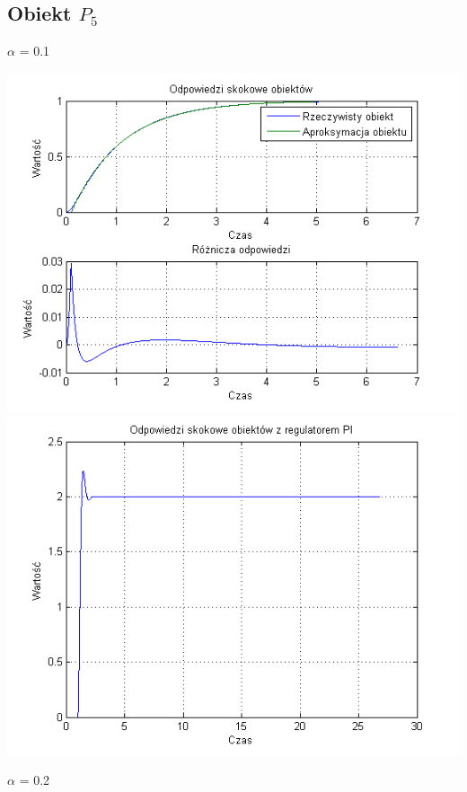 \documentclass[10pt,a4paper]{article}
\begin{document}
\subsection{Obiekt $P_5$}
$\alpha$ = 0.1
\begin{center}
\includegraphics[scale=1]{images/jeden/skrypt_117.png}\\
\includegraphics[scale=1]{images/jeden/skrypt_118.png}\\
\end{center}
\newpage
$\alpha$ = 0.2
\end{document}
